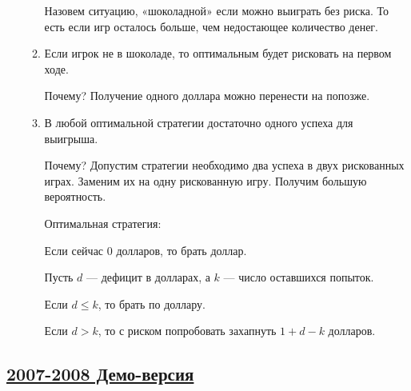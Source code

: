 \begin{enumerate}
\begin{enumerate}
Назовем ситуацию, «шоколадной» если можно выиграть без риска. То есть если игр
осталось больше, чем недостающее количество денег.
\item Если игрок не в шоколаде, то оптимальным будет рисковать на первом ходе.

Почему? Получение одного доллара можно перенести на попозже.
\item В любой оптимальной стратегии достаточно одного успеха для выигрыша.

Почему? Допустим стратегии необходимо два успеха в двух рискованных играх. Заменим
их  на одну рискованную игру. Получим большую вероятность.

Оптимальная стратегия:

Если сейчас 0 долларов, то брать доллар.

Пусть $d$ — дефицит в долларах, а $k$ — число оставшихся попыток.

Если $d\le k$, то брать по доллару.

Если $d>k$, то с риском попробовать захапнуть $1+d-k$ долларов.
\end{enumerate}
\end{enumerate}



\subsection[2007-2008 Демо-версия]{\hyperref[sec:kr_01_2007_2008_demo]{2007-2008 Демо-версия}}
\label{sec:sol_kr_01_2007_2008_demo}


